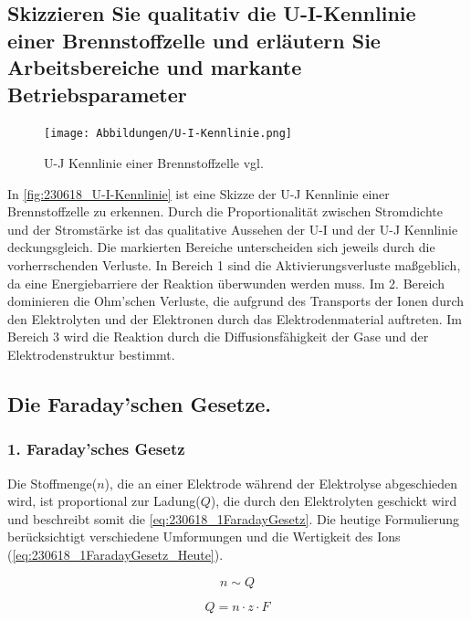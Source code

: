 \subsection{Skizzieren Sie qualitativ die U-I-Kennlinie einer Brennstoffzelle und erläutern Sie Arbeitsbereiche und markante Betriebsparameter}

\begin{figure}[H]
    \centering
    \texttt{[image: Abbildungen/U-I-Kennlinie.png]}
    \caption{U-J Kennlinie einer Brennstoffzelle vgl. \cite{BZ-Folien}}
    \label{fig:230618_U-I-Kennlinie}
\end{figure}

In \autoref{fig:230618_U-I-Kennlinie} ist eine Skizze der U-J Kennlinie einer Brennstoffzelle zu erkennen.
Durch die Proportionalität zwischen Stromdichte und der Stromstärke ist das qualitative Aussehen der U-I und der U-J Kennlinie deckungsgleich.
Die markierten Bereiche unterscheiden sich jeweils durch die vorherrschenden Verluste.
In Bereich 1 sind die Aktivierungsverluste maßgeblich, da eine Energiebarriere der Reaktion überwunden werden muss.
Im 2. Bereich dominieren die Ohm'schen Verluste, die aufgrund des Transports der Ionen durch den Elektrolyten und der Elektronen durch das Elektrodenmaterial auftreten.
Im Bereich 3 wird die Reaktion durch die Diffusionsfähigkeit der Gase und der Elektrodenstruktur bestimmt.

\subsection{Die Faraday'schen Gesetze.}

\subsubsection{1. Faraday'sches Gesetz}

Die Stoffmenge($n$), die an einer Elektrode während der Elektrolyse abgeschieden wird, ist proportional zur Ladung($Q$), die durch den Elektrolyten geschickt wird \cite{Faraday_G} und beschreibt somit die \autoref{eq:230618_1FaradayGesetz}.
Die heutige Formulierung berücksichtigt verschiedene Umformungen und die Wertigkeit des Ions (\autoref{eq:230618_1FaradayGesetz_Heute}).

\begin{equation}
    n \sim Q
    \label{eq:230618_1FaradayGesetz}
\end{equation}

\begin{equation}
    Q = n \cdot z \cdot F
    \label{eq:230618_1FaradayGesetz_Heute}
\end{equation}

